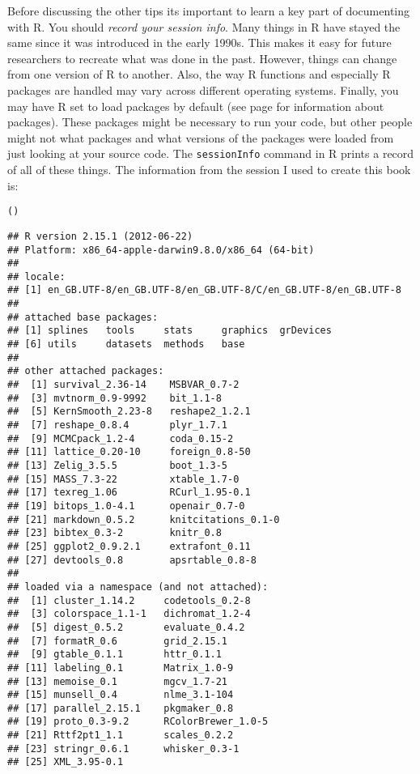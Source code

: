 {Before discussing the other tips its important to learn a key part of documenting with R. You should \emph{record your session info}. Many things in R have stayed the same since it was introduced in the early 1990s. This makes it easy for future researchers to recreate what was done in the past. However, things can change from one version of R to another. Also, the way R functions and especially R packages are handled may vary across different operating systems. Finally, you may have R set to load packages by default (see page \pageref{Packages} for information about packages). These packages might be necessary to run your code, but other people might not what packages and what versions of the packages were loaded from just looking at your source code. The \texttt{sessionInfo} command in R prints a record of all of these things. The information from the session I used to create this book is:

\begin{knitrout}
\color{fgcolor}\begin{kframe}
\begin{alltt}
()
\end{alltt}
\begin{verbatim}
## R version 2.15.1 (2012-06-22)
## Platform: x86_64-apple-darwin9.8.0/x86_64 (64-bit)
## 
## locale:
## [1] en_GB.UTF-8/en_GB.UTF-8/en_GB.UTF-8/C/en_GB.UTF-8/en_GB.UTF-8
## 
## attached base packages:
## [1] splines   tools     stats     graphics  grDevices
## [6] utils     datasets  methods   base     
## 
## other attached packages:
##  [1] survival_2.36-14    MSBVAR_0.7-2       
##  [3] mvtnorm_0.9-9992    bit_1.1-8          
##  [5] KernSmooth_2.23-8   reshape2_1.2.1     
##  [7] reshape_0.8.4       plyr_1.7.1         
##  [9] MCMCpack_1.2-4      coda_0.15-2        
## [11] lattice_0.20-10     foreign_0.8-50     
## [13] Zelig_3.5.5         boot_1.3-5         
## [15] MASS_7.3-22         xtable_1.7-0       
## [17] texreg_1.06         RCurl_1.95-0.1     
## [19] bitops_1.0-4.1      openair_0.7-0      
## [21] markdown_0.5.2      knitcitations_0.1-0
## [23] bibtex_0.3-2        knitr_0.8          
## [25] ggplot2_0.9.2.1     extrafont_0.11     
## [27] devtools_0.8        apsrtable_0.8-8    
## 
## loaded via a namespace (and not attached):
##  [1] cluster_1.14.2     codetools_0.2-8   
##  [3] colorspace_1.1-1   dichromat_1.2-4   
##  [5] digest_0.5.2       evaluate_0.4.2    
##  [7] formatR_0.6        grid_2.15.1       
##  [9] gtable_0.1.1       httr_0.1.1        
## [11] labeling_0.1       Matrix_1.0-9      
## [13] memoise_0.1        mgcv_1.7-21       
## [15] munsell_0.4        nlme_3.1-104      
## [17] parallel_2.15.1    pkgmaker_0.8      
## [19] proto_0.3-9.2      RColorBrewer_1.0-5
## [21] Rttf2pt1_1.1       scales_0.2.2      
## [23] stringr_0.6.1      whisker_0.3-1     
## [25] XML_3.95-0.1
\end{verbatim}
\end{kframe}
\end{knitrout}


}
